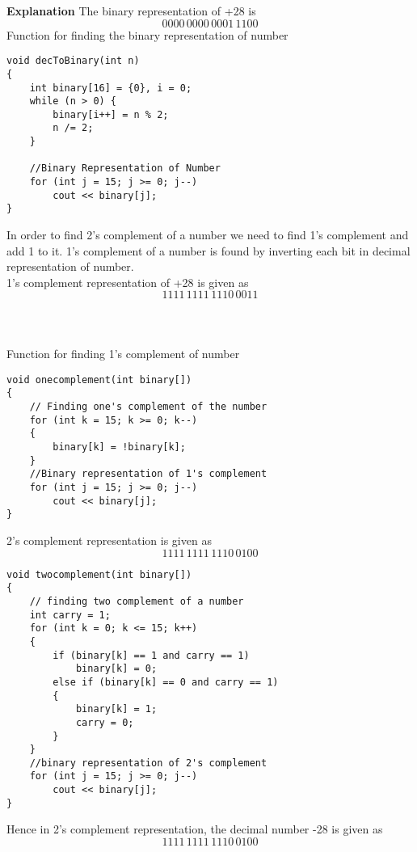 \documentclass[journal,12pt,twocolumn]{IEEEtran}
\begin{document}
\newline
\textbf{Explanation}
\newline
The binary representation of +28 is \\
\begin{equation}
    0000\,0000\,0001\,1100
\end{equation}
Function for finding the binary representation of number
 \begin{lstlisting}
void decToBinary(int n)
{
    int binary[16] = {0}, i = 0;
    while (n > 0) {
        binary[i++] = n % 2;
        n /= 2;
    }

    //Binary Representation of Number
    for (int j = 15; j >= 0; j--)
        cout << binary[j];
}

\end{lstlisting}
In order to find 2's complement of a number we need to find 1's complement and add 1 to it.
1's complement of a number is found by inverting each bit in decimal representation of number.\\
1's complement representation of +28 is given as
\begin{equation}
    1111\,1111\,1110\,0011 
\end{equation}
\\
\\
\\
Function for finding 1's complement of number
\begin{lstlisting}
void onecomplement(int binary[])
{
    // Finding one's complement of the number
    for (int k = 15; k >= 0; k--)
    {
        binary[k] = !binary[k];
    }
    //Binary representation of 1's complement
    for (int j = 15; j >= 0; j--)
        cout << binary[j];
}
\end{lstlisting}
2's complement representation is given as
\begin{equation}
    1111\,1111\,1110\,0100
\end{equation}
\begin{lstlisting}
void twocomplement(int binary[])
{
    // finding two complement of a number
    int carry = 1;
    for (int k = 0; k <= 15; k++)
    {
        if (binary[k] == 1 and carry == 1)
            binary[k] = 0;
        else if (binary[k] == 0 and carry == 1) 
        {
            binary[k] = 1;
            carry = 0;
        }
    }
    //binary representation of 2's complement
    for (int j = 15; j >= 0; j--)
        cout << binary[j];
}
\end{lstlisting}
Hence in 2's complement representation, the decimal number -28 is given as
\begin{equation}
    1111\,1111\,1110\,0100
\end{equation}
\end{document}
